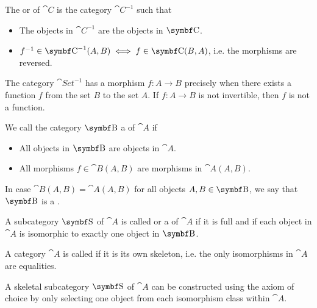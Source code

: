 \begin{definition}\label{def:opposite_category}\mcite\cite[def. 1.1.9]{Leinster2014}
  The  or  of \( \cat{C} \) is the category \( \cat{C}^{-1} \) such that
  \begin{itemize}
    \item The objects in \( \cat{C}^{-1} \) are the objects in \( \bop{C} \).
    \item \( f^{-1} \in \cat{C}^{-1}(A, B) \iff f \in \bop{C}(B, A) \), i.e. the morphisms are reversed.
  \end{itemize}
\end{definition}

\begin{example}
  The category \( \cat{Set}^{-1} \) has a morphism \( f: A \to B \) precisely when there exists a function \( f \) from the set \( B \) to the set \( A \). If \( f: A \to B \) is not invertible, then \( f \) is not a function.
\end{example}

\begin{definition}\label{def:subcategory}\mcite\cite[def. 1.2.18]{Leinster2014}
  We call the category \( \bop B \) a  of \( \cat{A} \) if
  \begin{itemize}
    \item All objects in \( \bop B \) are objects in \( \cat{A} \).
    \item All morphisms \( f \in \cat{B}(A, B) \) are morphisms in \( \cat{A}(A, B) \).
  \end{itemize}

  In case \( \cat{B}(A, B) = \cat{A}(A, B) \) for all objects \( A, B \in \bop B \), we say that \( \bop B \) is a .
\end{definition}

\begin{definition}\label{def:skeletal_category}\mcite\cite[91]{MacLane1994}
  A subcategory \( \bop S \) of \( \cat{A} \) is called  or a  of \( \cat{A} \) if it is full and if each object in \( \cat{A} \) is isomorphic to exactly one object in \( \bop B \).

  A category \( \cat{A} \) is called  if it is its own skeleton, i.e. the only isomorphisms in \( \cat{A} \) are equalities.
\end{definition}

\begin{remark}\label{rem:skeletal_subcategory_exists}
  A skeletal subcategory \( \bop S \) of \( \cat{A} \) can be constructed using the axiom of choice by only selecting one object from each isomorphism class within \( \cat{A} \).
\end{remark}

